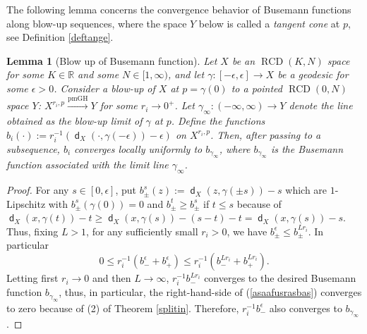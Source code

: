 \documentclass[11pt,reqno]{amsart}
\newtheorem{lemma}[theorem]{Lemma}
\theoremstyle{definition}
\numberwithin{equation}{section}
\DeclareMathOperator{\dist}{\mathsf{d}}
\DeclareMathOperator{\RCD}{RCD}
\begin{document}
The following lemma concerns the convergence behavior of Busemann functions along blow-up sequences, where the space $Y$ below is called a \textit{tangent cone} at $p$, see  Definition \ref{deftange}. 
\begin{lemma}[Blow up of Busemann function]\label{l:convergence-of-busemann}
    Let $X$ be an $\RCD(K, N)$ space for some $K \in \mathbb{R}$ and some $N \in [1, \infty)$, and let  $\gamma:[-\epsilon, \epsilon] \to X$ be a geodesic for some $\epsilon>0$. 
     Consider a blow-up of $X$ at $p = \gamma(0)$ to a pointed $\RCD(0,N)$ space $Y$:  $X^{r_i, p} \xrightarrow{\mathrm{pmGH}} Y$ for some  $r_i \to 0^+$.
Let $\gamma_{\infty}:(-\infty, \infty) \to Y$ denote the line obtained as the blow-up limit of $\gamma$ at $p$.
   Define the functions 
    $
    b_i (\cdot) :=  r^{-1}_i(\dist_X(\cdot , \gamma(-\epsilon))-\epsilon) 
    $ on $X^{r_i, p}$.
    Then, after  passing to a subsequence, $b_i$ converges locally uniformly to
   $b_{\gamma_{\infty}}$, where $b_{\gamma_{\infty}}$ is the Busemann function associated with the limit line $\gamma_{\infty}$.
\end{lemma}
\begin{proof}
    For any $s\in [0, \epsilon]$, put
    $
        b_{\pm}^s(z) := \dist_X(z, \gamma(\pm s))-s
    $
    which are $1$-Lipschitz with $b_{\pm}^s(\gamma(0))=0$ and $b^t_{\pm} \ge b^s_{\pm}$ if $t \le s$ because of $\dist_X(x, \gamma(t))-t\ge \dist_X(x, \gamma(s))-(s-t)-t=\dist_X(x, \gamma(s))-s$. Thus, fixing $L >1$, for any sufficiently small $r_i>0$, we have $b_{\pm}^{\epsilon}\le b_{\pm}^{Lr_i}$. In particular
    \begin{equation}\label{asaafusrasbas}
        0\le r_i^{-1}(b_-^{\epsilon}+b_+^{\epsilon}) \le r_i^{-1}(b_-^{Lr_i}+b_+^{Lr_i}).
    \end{equation}
   Letting first $r_i \to 0$  and then $L \to \infty$,  $r_i^{-1} b_-^{Lr_i}$ converges to the desired Busemann function $b_{\gamma_{\infty}}$, thus, in particular, 
    the right-hand-side of (\ref{asaafusrasbas}) converges to zero because of (2) of Theorem \ref{splitin}. Therefore, $r^{-1}_ib_-^{\epsilon}$ also converges to $b_{\gamma_{\infty}}$. 
\end{proof}
        
\end{document}
